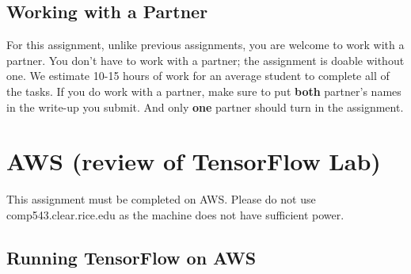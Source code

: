 \documentclass[11pt]{article}
\renewcommand\:{\colon} %
\begin{document}
\subsection*{Working with a Partner}
For this assignment, unlike previous assignments, you are welcome to work with a partner. You don't
have to work with a partner; the assignment is doable without one. We estimate 10-15 hours of work for an
average student to complete all of the tasks.
If you do work with a partner, make sure to put \textbf{both} partner's names in the write-up you submit.
And only \textbf{one} partner should turn in the assignment.


\section*{AWS  (review of TensorFlow Lab)}
This assignment must be completed on AWS. Please do not use comp543.clear.rice.edu as the machine does not have sufficient power.

\subsection*{Running TensorFlow on AWS }
\end{document}
